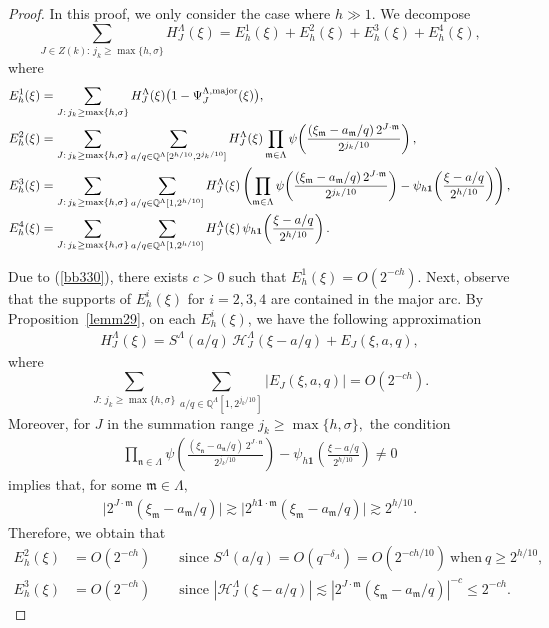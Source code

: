 \documentclass[11 pt,letterpaper]{amsart}
\theoremstyle{plain}
\theoremstyle{definition}
\theoremstyle{remark} \theoremstyle{exam} \theoremstyle{ob}
\numberwithin{equation}{section}
\begin{document}
\begin{proof}
 In this proof, we only consider the case where $h\gg 1$. We decompose
\[
\sum_{J\in Z(k):\, j_k\ge \max\{h,\sigma\}}  H^{\Lambda}_{J}(\xi)
=E^1_h(\xi)+E^2_h(\xi)+E^3_h(\xi)+E^4_h(\xi),
\]
where
\begin{align*}
E^1_h(\xi)& = \sum_{J:\, j_k\ge \max\{h,\sigma\}} 
H^{\Lambda}_J(\xi)\bigl(1- \Psi^{\Lambda,\mathrm{major}}_{J}(\xi)\bigr),\\
E^2_h(\xi)&=\sum_{J:\, j_k\ge \max\{h,\sigma\}} 
\sum_{a/q\in \mathbb{Q}^{\Lambda}[2^{h/10}, 2^{j_k/10} ] }  
H^{\Lambda}_J(\xi)\prod_{\mathfrak{m}\in \Lambda}
\psi\!\left(\frac{(\xi_{\mathfrak{m}}-a_{\mathfrak{m}}/q)\, 2^{J\cdot \mathfrak{m}}}{2^{j_k/10}}\right),\\
E^3_h(\xi)&=\sum_{J:\, j_k\ge \max\{h,\sigma\}}  
\sum_{a/q\in \mathbb{Q}^{\Lambda}[1,2^{h/10}]}  
H^{\Lambda}_J(\xi) 
\left(\prod_{\mathfrak{m}\in \Lambda}
\psi\!\left(\frac{(\xi_{\mathfrak{m}}-a_{\mathfrak{m}}/q)\, 2^{J\cdot \mathfrak{m}}}{2^{j_k/10}}\right)
-\psi_{h{\bf 1}}\!\left(\frac{\xi-a/q}{2^{h/10}}\right)\right),\\
E^4_h(\xi)&=\sum_{J:\, j_k\ge \max\{h,\sigma\}}    
\sum_{a/q\in \mathbb{Q}^{\Lambda}[1,2^{h/10}]}  
H^{\Lambda}_J(\xi)\,
\psi_{h{\bf 1}}\!\left(\frac{\xi-a/q}{2^{h/10}}\right).
\end{align*}

 
Due to (\ref{bb330}), there exists $c>0$ such that $E^1_h(\xi)=O(2^{-ch})$. Next, observe that the supports of $E^i_h(\xi)$ for $i=2,3,4$ are contained in the major arc. 
By Proposition~\ref{lemm29}, on each $E^i_h(\xi)$, we have the following approximation
\begin{align*}
H_J^{\Lambda}(\xi)
= S^{\Lambda}(a/q)\, \mathcal{H}^{\Lambda}_J(\xi-a/q)
+ E_J(\xi,a,q),
\end{align*}
where
\[
\sum_{J:\, j_k\ge \max\{h,\sigma\}} 
\sum_{a/q\in \mathbb{Q}^{\Lambda}[1,2^{j_k/10}]}
|E_J(\xi,a,q)|
=O(2^{-ch}).
\] Moreover, for
\(
J
\)
in the summation range
\(
j_k\ge \max\{h,\sigma\},
\)
the condition
\begin{align*}
	\prod_{\mathfrak{n}\in\Lambda}
	\psi\!\left(
	\frac{(\xi_{\mathfrak{n}}-a_{\mathfrak{n}}/q)\,
		2^{J\cdot\mathfrak{n}}}
	{2^{j_k/10}}
	\right)
	-
	\psi_{h\mathbf{1}}\!\left(
	\frac{\xi-a/q}{2^{h/10}}
	\right)
	\neq 0
\end{align*}
implies that, for some
\(
\mathfrak{m}\in\Lambda,
\)
\begin{align*}
	\bigl|2^{J\cdot\mathfrak{m}}
	(\xi_{\mathfrak{m}}-a_{\mathfrak{m}}/q)\bigr|\gtrsim \bigl|2^{h\mathbf{1}\cdot\mathfrak{m}}
	(\xi_{\mathfrak{m}}-a_{\mathfrak{m}}/q)\bigr|
	\gtrsim 2^{h/10}.
\end{align*}
Therefore, we obtain that
\begin{align*}
E^2_h(\xi)&=O(2^{-ch}) 
\qquad \text{since } S^{\Lambda}(a/q)=O(q^{-\delta_{\Lambda}})=O(2^{-ch/10}) \ \text{when} \  q\ge 2^{h/10},\\
E^3_h(\xi)&=O(2^{-ch})
\qquad \text{since } 
|\mathcal{H}_{J}^{\Lambda}(\xi-a/q)|
\lesssim |2^{J\cdot \mathfrak{m}} (\xi_{\mathfrak{m}}-a_{\mathfrak{m}}/q)|^{-c}
\le 2^{-ch}.
\end{align*}





\end{proof}
\end{document}
